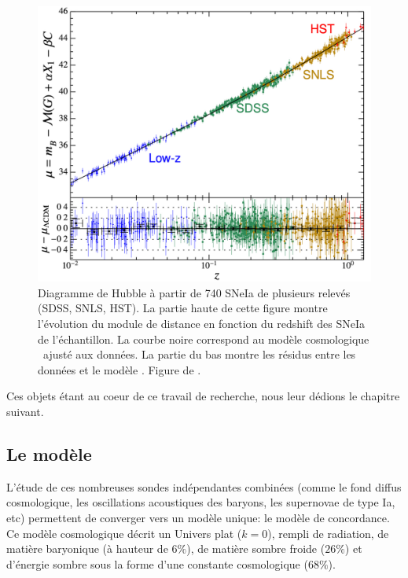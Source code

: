 \documentclass[../main/main.tex]{subfiles}
\begin{document}
\begin{figure}[ht]
  \begin{minipage}[c]{0.55\textwidth}
    \includegraphics[width=\textwidth]{../figures/01_cosmology/sneiabetoule.pdf}
  \end{minipage}\hfill
  \begin{minipage}[c]{0.42\textwidth}
    \caption[Diagramme de Hubble à partir de SNeIa de plusieurs relevés
    (SDSS, SNLS, HST)]{Diagramme de Hubble à partir de 740 SNeIa de plusieurs relevés
    (SDSS, SNLS, HST). La partie haute de cette figure montre
    l'évolution du module de distance en fonction du redshift
  des SNeIa de l'échantillon. La courbe noire correspond au modèle
  cosmologique \lcdm\ ajusté aux données. La partie du bas montre les résidus entre
  les données et le modèle \lcdm. Figure de \citet{Betoule2014}.}\label{fig:sneiabetoule}
  \end{minipage}
\end{figure}

Ces objets étant au coeur de ce travail de recherche, nous leur dédions
le chapitre suivant.

\subsection{Le modèle \lcdm}
L'étude de ces nombreuses sondes indépendantes combinées (comme le fond diffus
cosmologique, les oscillations acoustiques des baryons, les supernovae
de type Ia, etc) permettent de converger vers un modèle unique: le
modèle de concordance. Ce modèle cosmologique décrit un Univers plat
($k=0$), rempli de radiation, de  matière
baryonique (à hauteur de $6\%$), de matière sombre froide ($26\%$)
et d'énergie sombre sous la forme d'une constante cosmologique
($68\%$).
\end{document}
